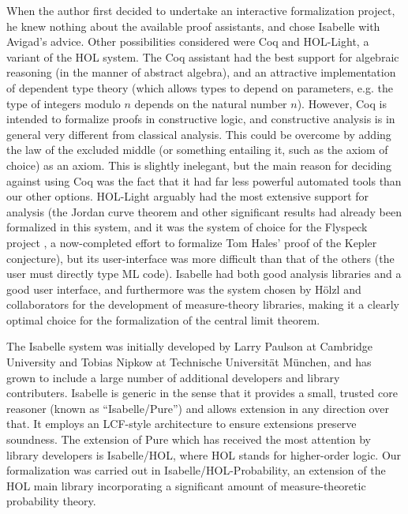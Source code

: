 \documentclass[leqno]{article}
\theoremstyle{definition}
\begin{document}
When the author first decided to undertake an interactive formalization project, he knew nothing about the available proof assistants, and chose Isabelle with Avigad's advice. Other possibilities considered were Coq and HOL-Light, a variant of the HOL system. The Coq assistant \cite{coq-ref} had the best support for algebraic reasoning (in the manner of abstract algebra), and an attractive implementation of dependent type theory (which allows types to depend on parameters, e.g. the type of integers modulo $n$ depends on the natural number $n$). However, Coq is intended to formalize proofs in constructive logic, and constructive analysis is in general very different from classical analysis. This could be overcome by adding the law of the excluded middle (or something entailing it, such as the axiom of choice) as an axiom. This is slightly inelegant, but the main reason for deciding against using Coq was the fact that it had far less powerful automated tools than our other options. HOL-Light \cite{harrison-hol-light} arguably had the most extensive support for analysis (the Jordan curve theorem \cite{hales-jordan} and other significant results had already been formalized in this system, and it was the system of choice for the Flyspeck project \cite{hales-kepler}, a now-completed effort to formalize Tom Hales' proof of the Kepler conjecture), but its user-interface was more difficult than that of the others (the user must directly type ML code). Isabelle had both good analysis libraries and a good user interface, and furthermore was the system chosen by H\"olzl and collaborators for the development of measure-theory libraries, making it a clearly optimal choice for the formalization of the central limit theorem.

The Isabelle system was initially developed by Larry Paulson at Cambridge University and Tobias Nipkow at Technische Universit\"at M\"unchen, and has grown to include a large number of additional developers and library contributers. Isabelle is generic in the sense that it provides a small, trusted core reasoner (known as ``Isabelle/Pure'') and allows extension in any direction over that. It employs an LCF-style architecture \cite{gordon-lcf} to ensure extensions preserve soundness. The extension of Pure which has received the most attention by library developers is Isabelle/HOL, where HOL stands for higher-order logic. Our formalization was carried out in Isabelle/HOL-Probability, an extension of the HOL main library incorporating a significant amount of measure-theoretic probability theory.
\end{document}
